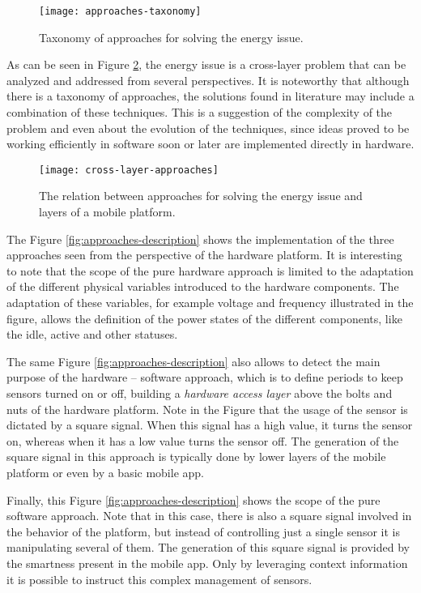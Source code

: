 \begin{figure}
\centering
\texttt{[image: approaches-taxonomy]}
\caption[Taxonomy of approaches for solving the energy issue]{Taxonomy of approaches for solving the energy issue.}
\label{fig:approaches-taxonomy}
\end{figure}

As can be seen in Figure \ref{fig:cross-layer-approaches}, the energy issue is a cross-layer problem that can be analyzed and addressed from several perspectives.
It is noteworthy that although there is a taxonomy of approaches, the solutions found in literature may include a combination of these techniques.
This is a suggestion of the complexity of the problem and even about the evolution of the techniques, since ideas proved to be working efficiently in software soon or later are implemented directly in hardware. 
\begin{figure}
\centering
\texttt{[image: cross-layer-approaches]}
\caption[Energy issue as an OS cross-platform problem]{The relation between approaches for solving the energy issue and layers of a mobile platform.}
\label{fig:cross-layer-approaches}
\end{figure}

The Figure \ref{fig:approaches-description} shows the implementation of the three approaches seen from the perspective of the hardware platform.
It is interesting to note that the scope of the pure hardware approach is limited to the adaptation of the different physical variables introduced to the hardware components.
The adaptation of these variables, for example voltage and frequency illustrated in the figure, allows the definition of the power states of the different components, like the idle, active and other statuses.


The same Figure \ref{fig:approaches-description} also allows to detect the main purpose of the hardware – software approach, which is to define periods to keep sensors turned on or off, building a \emph{hardware access layer} above the bolts and nuts of the hardware platform.
Note in the Figure that the usage of the sensor is dictated by a square signal. When this signal has a high value, it turns the sensor on, whereas when it has a low value turns the sensor off. 
The generation of the square signal in this approach is typically done by lower layers of the mobile platform or even by a basic mobile app.


Finally, this Figure \ref{fig:approaches-description} shows the scope of the pure software approach.
Note that in this case, there is also a square signal involved in the behavior of the platform, but instead of controlling just a single sensor it is manipulating several of them.
The generation of this square signal is provided by the smartness present in the mobile app.
Only by leveraging context information it is possible to instruct this complex management of sensors.


